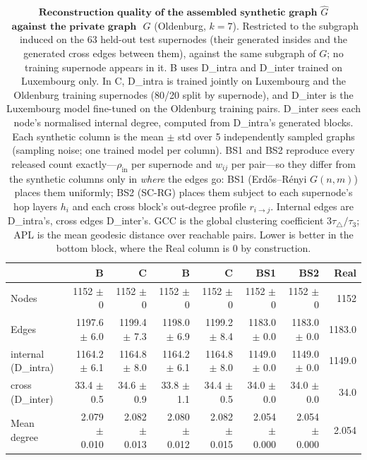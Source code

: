 \begin{table}[H]
\centering
\caption{$\textbf{Reconstruction quality of the assembled synthetic graph}$
$\widehat{G}$ $\textbf{ against the private graph }$ $G$ (Oldenburg, $k{=}7$). Restricted to the subgraph induced on the 63 held-out test supernodes (their generated insides and the generated cross edges between them), against the same subgraph of $G$; no training supernode appears in it.
B uses D\_intra and D\_inter trained on Luxembourg only. In C, D\_intra is trained jointly on Luxembourg and the Oldenburg training supernodes (80/20 split by supernode), and D\_inter is the Luxembourg model fine-tuned on the Oldenburg training pairs. D\_inter sees each node's normalised internal degree, computed from D\_intra's generated blocks. Each synthetic column is the
mean $\pm$ std over 5 independently sampled graphs (sampling noise; one trained
model per column). BS1 and BS2 reproduce every released count exactly---$\rho_{\mathrm{in}}$
per supernode and $w_{ij}$ per pair---so they differ from the synthetic columns
only in \emph{where} the edges go: BS1 (Erd\H{o}s--R\'enyi $G(n,m)$) places them
uniformly; BS2 (SC-RG) places them subject to each supernode's hop layers $h_i$ and
each cross block's out-degree profile $r_{i\to j}$. Internal edges are D\_intra's, cross edges
D\_inter's. GCC is the global clustering coefficient $3\tau_{\triangle}/\tau_{3}$;
APL is the mean geodesic distance over reachable pairs. Lower is better in the
bottom block, where the Real column is $0$ by construction.}
\label{tab:lsyn-oldenburg-k7-test}
\begin{tabular}{lrrrrrrr}
\toprule
 & B & C & B & C & BS1 & BS2 & Real \\
\midrule
Nodes                         & 1152 $\pm$ 0 & 1152 $\pm$ 0 & 1152 $\pm$ 0 & 1152 $\pm$ 0 & 1152 $\pm$ 0 & 1152 $\pm$ 0 & 1152 \\
Edges                         & 1197.6 $\pm$ 6.0 & 1199.4 $\pm$ 7.3 & 1198.0 $\pm$ 6.9 & 1199.2 $\pm$ 8.4 & 1183.0 $\pm$ 0.0 & 1183.0 $\pm$ 0.0 & 1183.0 \\
\quad internal (D\_intra)     & 1164.2 $\pm$ 6.1 & 1164.8 $\pm$ 8.0 & 1164.2 $\pm$ 6.1 & 1164.8 $\pm$ 8.0 & 1149.0 $\pm$ 0.0 & 1149.0 $\pm$ 0.0 & 1149.0 \\
\quad cross (D\_inter)        & 33.4 $\pm$ 0.5 & 34.6 $\pm$ 0.9 & 33.8 $\pm$ 1.1 & 34.4 $\pm$ 0.5 & 34.0 $\pm$ 0.0 & 34.0 $\pm$ 0.0 & 34.0 \\
Mean degree                   & 2.079 $\pm$ 0.010 & 2.082 $\pm$ 0.013 & 2.080 $\pm$ 0.012 & 2.082 $\pm$ 0.015 & 2.054 $\pm$ 0.000 & 2.054 $\pm$ 0.000 & 2.054 \\

\end{tabular}
\end{table}
